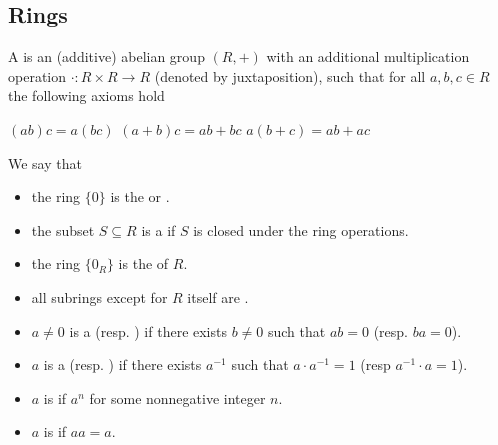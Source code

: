 \subsection{Rings}\label{sec:rings}

\begin{definition}\label{def:ring}
  A  is an (additive) abelian group \( (R, +) \) with an additional multiplication operation \( \cdot: R \times R \to R \) (denoted by juxtaposition), such that for all \( a, b, c \in R \) the following axioms hold
  \begin{description}
     \( (ab)c = a(bc) \)
     \( (a + b)c = ab + bc \)
     \( a(b + c) = ab + ac \)
  \end{description}

  We say that
  \begin{itemize}
    \item\label{def:ring/trivial_group} the ring \( \{ 0 \} \) is the  or .
    \item\label{def:ring/subring} the subset \( S \subseteq R \) is a  if \( S \) is closed under the ring operations.
    \item\label{def:ring/trivial_subgroup} the ring \( \{ 0_R \} \) is the  of \( R \).
    \item\label{def:ring/proper_subring} all subrings except for \( R \) itself are .
    \item\label{def:ring/zero_divisor} \( a \neq 0 \) is a  (resp. ) if there exists \( b \neq 0 \) such that \( ab = 0 \) (resp. \( ba = 0 \)).
    \item\label{def:ring/unit} \( a \) is a  (resp. ) if there exists \( a^{-1} \) such that \( a \cdot a^{-1} = 1 \) (resp \( a^{-1} \cdot a = 1 \)).
    \item\label{def:ring/nilpotent_element} \( a \) is  if \( a^n \) for some nonnegative integer \( n \).
    \item\label{def:ring/idempotent_element} \( a \) is  if \( aa = a \).
  \end{itemize}


\end{definition}
